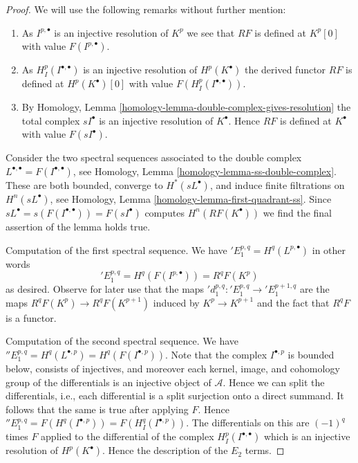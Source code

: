 \begin{proof}
We will use the following remarks without further mention:
\begin{enumerate}
\item As $I^{p, \bullet}$ is an injective resolution of
$K^p$ we see that $RF$ is defined at $K^p[0]$
with value $F(I^{p, \bullet})$.
\item As $H^p_I(I^{\bullet, \bullet})$ is an injective resolution of
$H^p(K^\bullet)$ the derived functor $RF$ is defined at $H^p(K^\bullet)[0]$
with value $F(H^p_I(I^{\bullet, \bullet}))$.
\item By
Homology, Lemma \ref{homology-lemma-double-complex-gives-resolution}
the total complex $sI^\bullet$ is an injective resolution of
$K^\bullet$. Hence $RF$ is defined at $K^\bullet$ with value
$F(sI^\bullet)$.
\end{enumerate}
Consider the two spectral sequences associated to the double complex
$L^{\bullet, \bullet} = F(I^{\bullet, \bullet})$, see
Homology, Lemma \ref{homology-lemma-ss-double-complex}.
These are both bounded, converge to $H^*(sL^\bullet)$, and induce
finite filtrations on $H^n(sL^\bullet)$, see
Homology, Lemma \ref{homology-lemma-first-quadrant-ss}.
Since
$sL^\bullet = s(F(I^{\bullet, \bullet})) = F(sI^\bullet)$ computes
$H^n(RF(K^\bullet))$ we find the final assertion of the lemma holds true.

\medskip\noindent
Computation of the first spectral sequence. We have
${}'E_1^{p, q} = H^q(L^{p, \bullet})$ in other words
$$
{}'E_1^{p, q} = H^q(F(I^{p, \bullet})) = R^qF(K^p)
$$
as desired. Observe for later use that the maps
${}'d_1^{p, q} : {}'E_1^{p, q} \to {}'E_1^{p + 1, q}$ are the maps
$R^qF(K^p) \to R^qF(K^{p + 1})$ induced by $K^p \to K^{p + 1}$
and the fact that $R^qF$ is a functor.

\medskip\noindent
Computation of the second spectral sequence. We have
${}''E_1^{p, q} = H^q(L^{\bullet, p}) = H^q(F(I^{\bullet, p}))$.
Note that the complex $I^{\bullet, p}$ is bounded below,
consists of injectives, and moreover each kernel, image, and
cohomology group of the differentials is an injective object
of $\mathcal{A}$. Hence we can split the differentials, i.e.,
each differential is a split surjection onto a direct summand.
It follows that the same is true after applying $F$. Hence
${}''E_1^{p, q} = F(H^q(I^{\bullet, p})) = F(H^q_I(I^{\bullet, p}))$.
The differentials on this are $(-1)^q$ times $F$ applied to
the differential of the complex $H^p_I(I^{\bullet, \bullet})$
which is an injective resolution of $H^p(K^\bullet)$. Hence the
description of the $E_2$ terms.
\end{proof}

